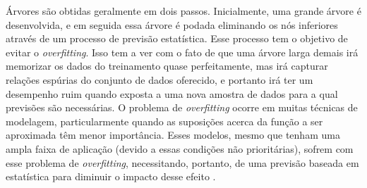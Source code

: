 Árvores são obtidas geralmente em dois passos. Inicialmente, uma grande árvore é desenvolvida, e em seguida essa árvore é podada eliminando os nós inferiores através de um processo de previsão estatística. Esse processo tem o objetivo de evitar o \textit{overfitting}. Isso tem a ver com o fato de que uma árvore larga demais irá memorizar os dados do treinamento quase perfeitamente, mas irá capturar relações espúrias do conjunto de dados oferecido, e portanto irá ter um desempenho ruim quando exposta a uma nova amostra de dados para a qual previsões são necessárias. O problema de \textit{overfitting} ocorre em muitas técnicas de modelagem, particularmente quando as suposições acerca da função a ser aproximada têm menor importância. Esses modelos, mesmo que tenham uma ampla faixa de aplicação (devido a essas condições não prioritárias), sofrem com esse problema de \textit{overfitting}, necessitando, portanto, de uma previsão baseada em estatística para diminuir o impacto desse efeito \cite{torgo2003data}.

